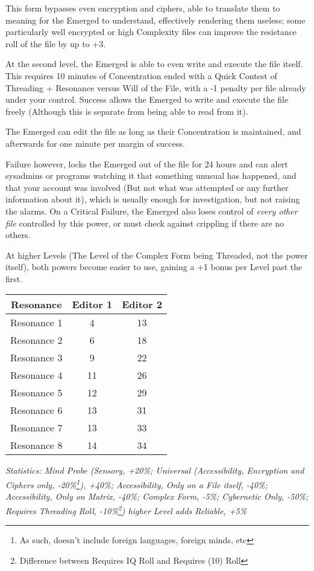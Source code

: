 \begin{multicols*}{3}
	This form bypasses even encryption and ciphers, able to translate them to meaning for the Emerged to understand, effectively rendering them useless; some particularly well encrypted or high Complexity files can improve the resistance roll of the file by up to +3.
	
	At the second level, the Emerged is able to even write and execute the file itself. This requires 10 minutes of Concentration ended with a Quick Contest of Threading + Resonance versus Will of the File, with a -1 penalty per file already under your control. Success allows the Emerged to write and execute the file freely (Although this is separate from being able to read from it).
	
	The Emerged can edit the file as long as their Concentration is maintained, and afterwards for one minute per margin of success.
	
	Failure however, locks the Emerged out of the file for 24 hours and can alert sysadmins or programs watching it that something unusual has happened, and that your account was involved (But not what was attempted or any further information about it), which is usually enough for investigation, but not raising the alarms. On a Critical Failure, the Emerged also loses control of \textit{every other file} controlled by this power, or must check against crippling if there are no others.
	
	At higher Levels (The Level of the Complex Form being Threaded, not the power itself), both powers become easier to use, gaining a +1 bonus per Level past the first.
	
	\begin{center}
		\begin{tabular}{|c|c|c|}
			\hline
			Resonance & Editor 1 & Editor 2 \\
			\hline
			\hline
			Resonance 1 & 4 & 13 \\
			Resonance 2 & 6 & 18 \\
			Resonance 3 & 9 & 22 \\
			Resonance 4 & 11 & 26 \\
			Resonance 5 & 12 & 29 \\
			Resonance 6 & 13 & 31 \\
			Resonance 7 & 13 & 33 \\
			Resonance 8 & 14 & 34 \\
			\hline
		\end{tabular}
	\end{center}
	
	\textcolor{OliveGreen}{\textit{Statistics: Mind Probe (Sensory, +20\%; Universal (Accessibility, Encryption and Ciphers only, -20\%\footnote{As such, doesn't include foreign languages, foreign minds, etc}), +40\%; Accessibility, Only on a File itself, -40\%; Accessibility, Only on Matrix, -40\%; Complex Form, -5\%; Cybernetic Only, -50\%; Requires Threading Roll, -10\%\footnote{Difference between Requires IQ Roll and Requires (10) Roll}) higher Level adds Reliable, +5\%}}
			

\end{multicols*}
